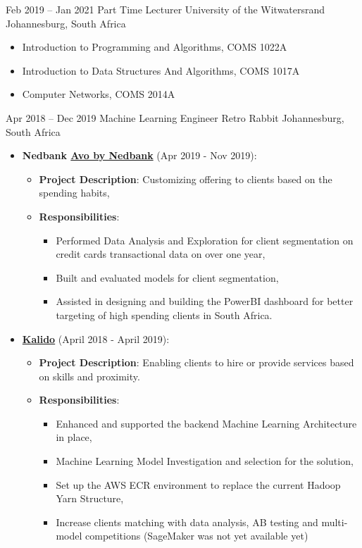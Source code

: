 \documentclass[letterpaper]{moderncv}        %
\begin{document}
\cventry
{Feb 2019 -- Jan 2021}
{Part Time Lecturer}
{University of the Witwatersrand}
{Johannesburg, South Africa}
{}
{\begin{itemize}%
		\item Introduction to Programming and Algorithms, COMS 1022A
		\item Introduction to Data Structures And Algorithms, COMS 1017A
		\item Computer Networks, COMS 2014A
\end{itemize}}
\cventry
{Apr 2018 -- Dec 2019}
{Machine Learning Engineer}
{Retro Rabbit}
{Johannesburg, South Africa}
{}
{\begin{itemize}%
		\item \textbf{Nedbank \href{https://www.nedbank.co.za/content/nedbank/desktop/gt/en/personal/nedbank-money/avo.html}{Avo by Nedbank}} (Apr 2019 - Nov 2019): 
		\begin{itemize}
			\item \textbf{Project Description}: Customizing offering to clients based on the spending habits,
			\item \textbf{Responsibilities}:
			\begin{itemize}
				\item Performed Data Analysis and Exploration for client segmentation on credit cards transactional data on over one year,
				\item Built and evaluated models for client segmentation,
				\item Assisted in designing and building the PowerBI dashboard for better targeting of high spending clients in South Africa. 
			\end{itemize}
		\end{itemize}
		\item \textbf{\href{https://www.kalido.me/}{Kalido}} (April 2018 - April 2019): 
		\begin{itemize}
			\item \textbf{Project Description}: Enabling clients to hire or provide services based on skills and proximity.
			\item \textbf{Responsibilities}:
			\begin{itemize}
			\item Enhanced and supported the backend Machine Learning Architecture in place,
			\item Machine Learning Model Investigation and selection for the solution,
			\item Set up the AWS ECR environment to replace the current Hadoop Yarn Structure,
			\item Increase clients matching with data analysis, AB testing and multi-model competitions (SageMaker was not yet available yet)
		\end{itemize}
		\end{itemize}
	\end{itemize}
}
\end{document}
